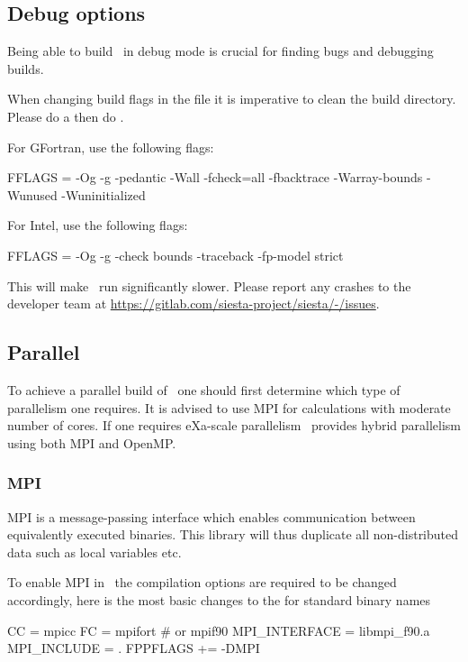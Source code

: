 \subsection{Debug options}
\label{sec:build:debug}

Being able to build \siesta\ in debug mode is crucial for finding bugs
and debugging builds.

When changing build flags in the  file it is
imperative to clean the build directory. Please do a  then do .

For GFortran, use the following flags:
\begin{shellexample}
  FFLAGS = -Og -g -pedantic -Wall -fcheck=all -fbacktrace -Warray-bounds -Wunused -Wuninitialized
\end{shellexample}

For Intel, use the following flags:
\begin{shellexample}
  FFLAGS = -Og -g -check bounds -traceback -fp-model strict
\end{shellexample}

This will make \siesta\ run significantly slower. Please report any
crashes to the developer team at
\url{https://gitlab.com/siesta-project/siesta/-/issues}.




\subsection{Parallel}
\label{sec:parallel}

To achieve a parallel build of \siesta\ one should first determine
which type of parallelism one requires. It is advised to use MPI for
calculations with moderate number of cores. If one requires eXa-scale
parallelism \siesta\ provides hybrid parallelism using both MPI and
OpenMP. 


\subsubsection{MPI}

MPI is a message-passing interface which enables communication between
equivalently executed binaries. This library will thus duplicate all
non-distributed data such as local variables etc. 

To enable MPI in \siesta\ the compilation options are required to be
changed accordingly, here is the most basic changes to the
 for standard binary names
\begin{shellexample}
  CC = mpicc
  FC = mpifort # or mpif90
  MPI_INTERFACE = libmpi_f90.a
  MPI_INCLUDE = .
  FPPFLAGS += -DMPI
\end{shellexample}


